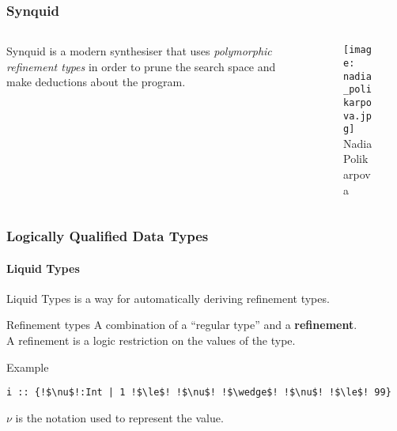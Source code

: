 \documentclass{beamer}
\makeatletter
\newcommand{\hl}{\textcolor{fibeamer@darkColor1}}
\makeatother
\begin{document}
\begin{frame}
	\frametitle{\textbf{Synquid} \cite{polikarpova_program_2016}}

	\begin{columns}[c] %
		\begin{column}{.48\textwidth}
			Synquid is a modern synthesiser that uses \textit{polymorphic refinement types}
			in order to prune the search space and make deductions about the program.
		\end{column}%
		\begin{column}{.48\textwidth}%
			\begin{figure}
				\texttt{[image: nadia\_polikarpova.jpg]}\\
				Nadia Polikarpova
			\end{figure}


		\end{column}%
	\end{columns}

\end{frame}

%

\begin{frame}[fragile]
	\frametitle{Logically Qualified Data Types}
	\framesubtitle{Liquid Types \cite{rondon_liquid_2008}}

	Liquid Types is a way for automatically deriving \hl{refinement types}.

	\begin{block}{Refinement types}
		A combination of a ``regular type'' and a \textbf{refinement}.\\
		A refinement is a logic restriction on the values of the type.\\
	\end{block}

	\pause

	\begin{exampleblock}{Example}
		\vspace*{-.2\baselineskip}
		\begin{lstlisting}[escapechar=!,style=synquid]
i :: {!$\nu$!:Int | 1 !$\le$! !$\nu$! !$\wedge$! !$\nu$! !$\le$! 99}
		\end{lstlisting}
	\end{exampleblock}
	$\nu$ is the notation used to represent the value.
\end{frame}
\end{document}
